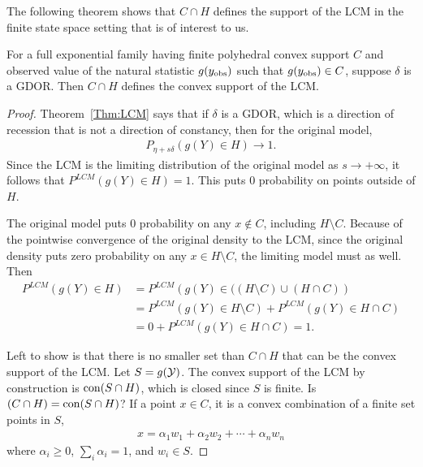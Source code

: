 The following theorem shows that $C \cap H$ defines the support of the LCM 
in the finite state space setting that is of interest to us.  
\begin{theorem} \label{Thm:C-H}
For a full exponential family having finite polyhedral convex support $C$ and observed value 
of the natural statistic $g(y_{\text{obs}})$ such that $g(y_{\text{obs}}) \in C$, suppose $\delta$ is a GDOR.
Then $C \cap H$ defines the convex support of the LCM.
\end{theorem}
\begin{proof}
Theorem~\ref{Thm:LCM} says that if $\delta$ is a GDOR, which is a direction of recession
that is not a direction of constancy, then for the original model,
\begin{align*}
	P_{\eta+s\delta}( g(Y) \in H ) \to 1.
\end{align*}
Since the LCM is the limiting distribution of the original model as $s \to +\infty$, it follows that $P^{LCM}(g(Y) \in H) = 1$.  
This puts 0 probability on points outside of $H$.  

The original model puts 0 probability on any $x \notin C$, including $H \setminus C$.  Because of the pointwise convergence of the original density to the LCM, since the original density puts zero probability on any $x \in H \setminus C$, the limiting model must as well.  Then
\begin{align*}
	P^{LCM}(g(Y) \in H) &= P^{LCM} \left( g(Y) \in ( (H \setminus C)  \cup (H \cap C)   \right ) \\
	 			&= P^{LCM} \left( g(Y) \in H \setminus C \right) 
								+ P^{LCM} \left( g(Y) \in H \cap C \right ) \\
	 			&= 0 + P^{LCM} \left( g(Y) \in H \cap C  \right ) = 1.
\end{align*}

Left to show is that there is no smaller set than $C \cap H$ that 
can be the convex support of the LCM.
Let $S = g({\mathcal Y})$.  The convex support of the LCM by construction is $\operatorname{con}(S \cap H)$, 
which is closed since $S$ is finite.  
Is $(C \cap H) = \operatorname{con}(S \cap H)$?
If a point $x \in C$, it is a convex combination of a finite set points in $S$,
\begin{align*}
	x = \alpha_1 w_1 + \alpha_2 w_2 + \cdots + \alpha_n w_n
\end{align*}
where $\alpha_i \geq 0$, $\sum_i \alpha_i = 1$, and $w_i \in S$.


\end{proof}
